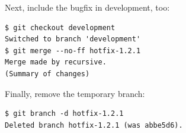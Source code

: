 Next, include the bugfix in development, too:

\begin{verbatim}
$ git checkout development
Switched to branch 'development'
$ git merge --no-ff hotfix-1.2.1
Merge made by recursive.
(Summary of changes)
\end{verbatim}

Finally, remove the temporary branch:
\begin{verbatim}
$ git branch -d hotfix-1.2.1
Deleted branch hotfix-1.2.1 (was abbe5d6).
\end{verbatim}
